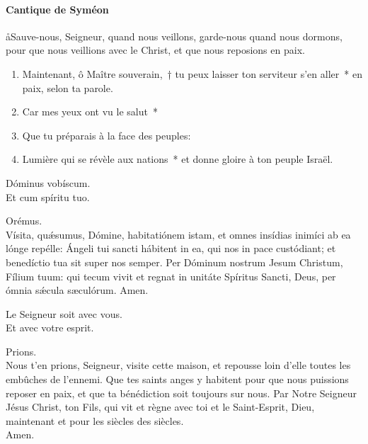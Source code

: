 \documentclass[twoside]{article}
\begin{document}
\begin{paracol}[1]{2}
\switchcolumn

\paragraph{Cantique de Syméon}

\aa Sauve-nous, Seigneur, quand nous veillons, garde-nous quand nous dormons, pour que nous veillions avec le Christ, et que nous reposions en paix.


\begin{enumerate}[wide, itemsep=0mm, labelwidth=!, labelindent=0pt, label=\color{gregoriocolor}\theenumi]
\item Maintenant, ô Maître souverain,~† tu peux laisser ton serviteur s'en aller~* en paix, selon ta parole.
\item Car mes yeux ont vu le salut~*
\item Que tu préparais à la face des peuples:
\item Lumière qui se révèle aux nations~* et donne gloire à ton peuple Israël.
\end{enumerate}

\switchcolumn*

%
%
%

\vv Dóminus vobíscum. \\
\rr Et cum spíritu tuo.

Orémus.\\
Vísita, quǽsumus, Dómine, habitatiónem istam, et omnes insídias inimíci ab ea lónge repélle: Ángeli tui sancti hábitent in ea, qui nos in pace custódiant; et benedíctio tua sit super nos semper.
Per Dóminum nostrum Jesum Christum, Fílium tuum: qui tecum vivit et regnat in unitáte Spíritus Sancti, Deus, per ómnia sǽcula sæculórum.
\rr Amen.

\switchcolumn

\vv Le Seigneur soit avec vous. \\
\rr Et avec votre esprit.

Prions. \\
Nous t'en prions, Seigneur, visite cette maison, et repousse loin d'elle toutes les embûches de l'ennemi. Que tes saints anges y habitent pour que nous puissions reposer en paix, et que ta bénédiction soit toujours sur nous.
Par Notre Seigneur Jésus Christ, ton Fils, qui vit et règne avec toi et le Saint-Esprit, Dieu, maintenant et pour les siècles des siècles.\\
\rr Amen.


\end{paracol}
\end{document}
